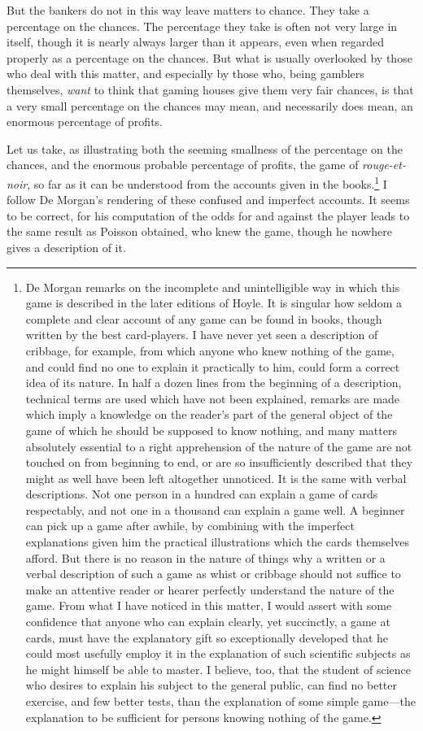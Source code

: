 \documentclass[letterpaper,12pt,oneside,openany]{memoir}
\begin{document}
But the bankers do not in this way leave matters to
chance. They take a percentage on the chances. The
percentage they take is often not very large in itself,
though it is nearly always larger than it appears, even
when regarded properly as a percentage on the chances.
But what is usually overlooked by those who deal with
this matter, and especially by those who, being gamblers
themselves, \textit{want} to think that gaming houses give them
very fair chances, is that a very small percentage on the
chances may mean, and necessarily does mean, an
enormous percentage of profits.

Let us take, as illustrating both the seeming smallness
of the percentage on the chances, and the enormous
probable percentage of profits, the game of \textit{rouge-et-noir},
so far as it can be understood from the accounts
given in the books.\footnote{De Morgan remarks on the incomplete and unintelligible way
in which this game is described in the later editions of Hoyle. It
is singular how seldom a complete and clear account of any game
can be found in books, though written by the best card-players. I
have never yet seen a description of cribbage, for example, from
which anyone who knew nothing of the game, and could find no
one to explain it practically to him, could form a correct idea of its
nature. In half a dozen lines from the beginning of a description,
technical terms are used which have not been explained, remarks
are made which imply a knowledge on the reader's part of the
general object of the game of which he should be supposed to know
nothing, and many matters absolutely essential to a right apprehension
of the nature of the game are not touched on from beginning
to end, or are so insufficiently described that they might as well
have been left altogether unnoticed. It is the same with verbal
descriptions. Not one person in a hundred can explain a game of
cards respectably, and not one in a thousand can explain a game
well. A beginner can pick up a game after awhile, by combining
with the imperfect explanations given him the practical illustrations
which the cards themselves afford. But there is no reason in the
nature of things why a written or a verbal description of such a
game as whist or cribbage should not suffice to make an attentive
reader or hearer perfectly understand the nature of the game.
From what I have noticed in this matter, I would assert with some
confidence that anyone who can explain clearly, yet succinctly, a
game at cards, must have the explanatory gift so exceptionally
developed that he could most usefully employ it in the explanation
of such scientific subjects as he might himself be able to master.
I believe, too, that the student of science who desires to explain his
subject to the general public, can find no better exercise, and few
better tests, than the explanation of some simple game---the explanation
to be sufficient for persons knowing nothing of the game.}
I follow De Morgan's rendering
of these confused and imperfect accounts. It seems to
be correct, for his computation of the odds for and
against the player leads to the same result as Poisson
obtained, who knew the game, though he nowhere gives
a description of it.
\end{document}
